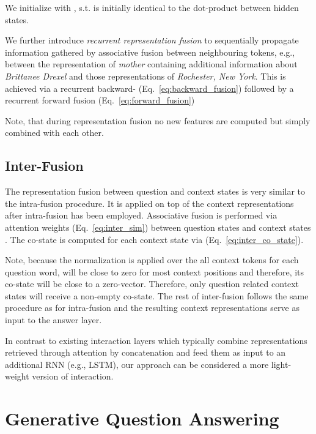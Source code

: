 \documentclass[11pt,a4paper]{article}
\begin{document}
We initialize  with , s.t.  is initially identical to the dot-product between hidden states.

We further introduce \textit{recurrent representation fusion} to sequentially propagate information gathered by associative fusion between neighbouring tokens, e.g., between the representation of \textit{mother} containing additional information about \textit{Brittanee Drexel} and those representations of \textit{Rochester, New York}. This is achieved via a recurrent backward- (Eq.~\ref{eq:backward_fusion}) followed by a recurrent forward fusion (Eq.~\ref{eq:forward_fusion}) 



Note, that during representation fusion no new features are computed but simply combined with each other. 

\subsection{Inter-Fusion}

The representation fusion between question and context states is very similar to the intra-fusion procedure. It is applied on top of the context representations after intra-fusion has been employed. Associative fusion is performed via attention weights  (Eq.~\ref{eq:inter_sim}) between question states  and context states . The co-state is computed for each context state via  (Eq.~\ref{eq:inter_co_state}).



Note, because the  normalization is applied over the all context tokens for each question word,  will be close to zero for most context positions and therefore, its co-state will be close to a zero-vector. Therefore, only question related context states will receive a non-empty co-state. The rest of inter-fusion follows the same procedure as for intra-fusion and the resulting context representations serve as input to the answer layer.

In contrast to existing interaction layers which typically combine representations retrieved through attention by concatenation and feed them as input to an additional RNN (e.g., LSTM), our approach can be considered a more light-weight version of interaction. 


\section{Generative Question Answering}
\end{document}
